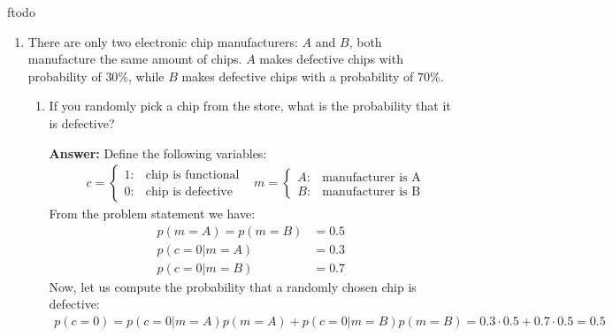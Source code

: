 ƒtodo\documentclass{article}
\newenvironment{QandA}{\begin{enumerate}[label=\arabic*.]}{\end{enumerate}}
\newenvironment{InnerQandA}{\begin{enumerate}[label=\roman*.]}{\end{enumerate}}
\newenvironment{answer}{\par\normalfont \textbf{Answer:}}{}
\newcommand{\g}{\vert}
\begin{document}
\begin{QandA}
    \item There are only two electronic chip manufacturers: $A$ and $B$, both manufacture the same amount of chips. $A$ makes defective chips with probability of $30\%$, while $B$ makes defective chips with a probability of $70\%$.
    \begin{InnerQandA}
        \item If you randomly pick a chip from the store, what is the probability that it is defective?
        \begin{answer}
            Define the following variables:
            \begin{align*}
                &c = \begin{cases}
                    1: &\text{chip is functional} \\
                    0: &\text{chip is defective}
                \end{cases}
                &m = \begin{cases}
                    A: &\text{manufacturer is A} \\
                    B: &\text{manufacturer is B}
                \end{cases}
            \end{align*}
            From the problem statement we have:
            \begin{align*}
                p(m=A) = p(m=B) &= 0.5 \\
                p(c=0 \g m=A) &= 0.3 \\
                p(c=0 \g m=B) &= 0.7
            \end{align*}
            Now, let us compute the probability that a randomly chosen chip is defective:
            \begin{align*}
                p(c=0) = p(c=0 \g m=A)p(m=A) + p(c=0 \g m=B)p(m=B) = 0.3 \cdot 0.5 + 0.7 \cdot 0.5 = 0.5 
            \end{align*}
        \end{answer}


\end{InnerQandA}
\end{QandA}
\end{document}
